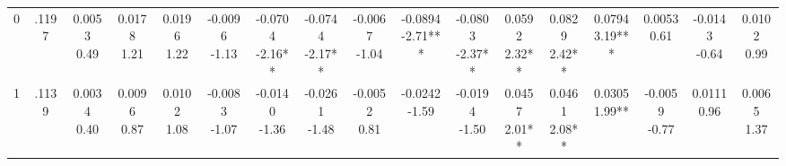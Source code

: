 \begin{landscape}
\begin{center}
{\begin{adjustbox}{max width=\textheight}
\begin{tabular}{lcccccccccccccccc}
0 & .1197 & \shortstack{0.0053\\0.49} & \shortstack{0.0178\\1.21} & \shortstack{0.0196\\1.22} & \shortstack{-0.0096\\-1.13} & \shortstack{-0.0704\\-2.16**} & \shortstack{-0.0744\\-2.17**} & \shortstack{-0.0067\\-1.04} & \shortstack{-0.0894\\-2.71***} & \shortstack{-0.0803\\-2.37**} & \shortstack{0.0592\\2.32**} & \shortstack{0.0829\\2.42**} & \shortstack{0.0794\\3.19***} & \shortstack{0.0053\\0.61} & \shortstack{-0.0143\\-0.64} & \shortstack{0.0102\\0.99} \\
1 & .1139 & \shortstack{0.0034\\0.40} & \shortstack{0.0096\\0.87} & \shortstack{0.0102\\1.08} & \shortstack{-0.0083\\-1.07} & \shortstack{-0.0140\\-1.36} & \shortstack{-0.0261\\-1.48} & \shortstack{-0.0052\\0.81} & \shortstack{-0.0242\\-1.59} & \shortstack{-0.0194\\-1.50} & \shortstack{0.0457\\2.01**} & \shortstack{0.0461\\2.08**} & \shortstack{0.0305\\1.99**} & \shortstack{-0.0059\\-0.77} & \shortstack{0.0111\\0.96} & \shortstack{0.0065\\1.37} \\

\end{tabular}
\end{adjustbox}}
\end{center}
\end{landscape}
